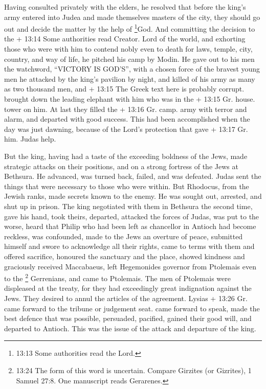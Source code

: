  Having consulted privately with the elders, he resolved
that before the king's army entered into Judea and made themselves
masters of the city, they should go out and decide the matter by the
help of \footnote{13:13 Some authorities read the Lord.}God.
 And committing the decision to the + 13:14 Some
authorities read Creator. Lord of the world, and exhorting those who
were with him to contend nobly even to death for laws, temple, city,
country, and way of life, he pitched his camp by Modin.  He
gave out to his men the watchword, ``VICTORY IS GOD'S'', with a chosen
force of the bravest young men he attacked by the king's pavilion by
night, and killed of his army as many as two thousand men, and + 13:15
The Greek text here is probably corrupt. brought down the leading
elephant with him who was in the + 13:15 Gr. house. tower on him.
 At last they filled the + 13:16 Gr. camp. army with terror
and alarm, and departed with good success.  This had been
accomplished when the day was just dawning, because of the Lord's
protection that gave + 13:17 Gr. him. Judas help.

 But the king, having had a taste of the exceeding boldness
of the Jews, made strategic attacks on their positions, 
and on a strong fortress of the Jews at Bethsura. He advanced, was
turned back, failed, and was defeated.  Judas sent the
things that were necessary to those who were within.  But
Rhodocus, from the Jewish ranks, made secrets known to the enemy. He was
sought out, arrested, and shut up in prison.  The king
negotiated with them in Bethsura the second time, gave his hand, took
theirs, departed, attacked the forces of Judas, was put to the worse,
 heard that Philip who had been left as chancellor in
Antioch had become reckless, was confounded, made to the Jews an
overture of peace, submitted himself and swore to acknowledge all their
rights, came to terms with them and offered sacrifice, honoured the
sanctuary and the place,  showed kindness and graciously
received Maccabaeus, left Hegemonides governor from Ptolemais even to
the \footnote{13:24 The form of this word is uncertain. Compare Girzites
  (or Gizrites), 1 Samuel 27:8. One manuscript reads Gerarenes.}
Gerrenians,  and came to Ptolemais. The men of Ptolemais
were displeased at the treaty, for they had exceedingly great
indignation against the Jews. They desired to annul the articles of the
agreement.  Lysias + 13:26 Gr. came forward to the tribune
or judgement seat. came forward to speak, made the best defence that was
possible, persuaded, pacified, gained their good will, and departed to
Antioch. This was the issue of the attack and departure of the king.

